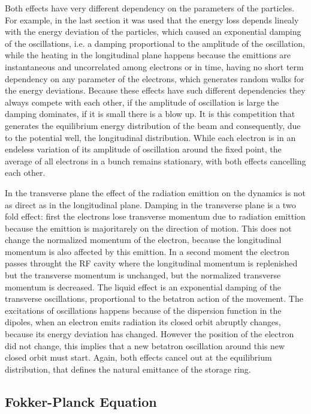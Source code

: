 \documentclass[
	12pt,				%
	openright,			%
	oneside,			%
	a4paper,		%
	chapter=TITLE,		%
	section=TITLE,		%
    brazil,				%
	english,			%
	sumario=tradicional,
	]{abntex2}
\begin{document}
  Both effects have very different dependency on the parameters of the particles. For example, in the last section it was used that the energy loss depends linealy with the energy deviation of the particles, which caused an exponential damping of the oscillations, i.e. a damping proportional to the amplitude of the oscillation, while the heating in the longitudinal plane happens because the emittions are instantaneous and uncorrelated among electrons or in time, having no short term dependency on any parameter of the electrons, which generates random walks for the energy deviations. Because these effects have such different dependencies they always compete with each other, if the amplitude of oscillation is large the damping dominates, if it is small there is a blow up. It is this competition that generates the equilibrium energy distribution of the beam and consequently, due to the potential well, the longitudinal distribution. While each electron is in an endeless variation of its amplitude of oscillation around the fixed point, the average of all electrons in a bunch remains stationary, with both effects cancelling each other.

  In the transverse plane the effect of the radiation emittion on the dynamics is not as direct as in the longitudinal plane. Damping in the transverse plane is a two fold effect: first the electrons lose transverse momentum due to radiation emittion because the emittion is majoritarely on the direction of motion. This does not change the normalized momentum of the electron, because the longitudinal momentum is also affected by this emittion. In a second moment the electron passes throught the RF cavity where the longitudinal momentum is replenished but the transverse momentum is unchanged, but the normalized transverse momentum is decreased. The liquid effect is an exponential damping of the transverse oscillations, proportional to the betatron action of the movement. The excitations of oscillations happens because of the dispersion function in the dipoles, when an electron emits radiation its closed orbit abruptly changes, because its energy deviation has changed. However the position of the electron did not change, this implies that a new betatron oscillation around this new closed orbit must start. Again, both effects cancel out at the equilibrium distribution, that defines the natural emittance of the storage ring.

    \subsection{Fokker-Planck Equation}
\end{document}
